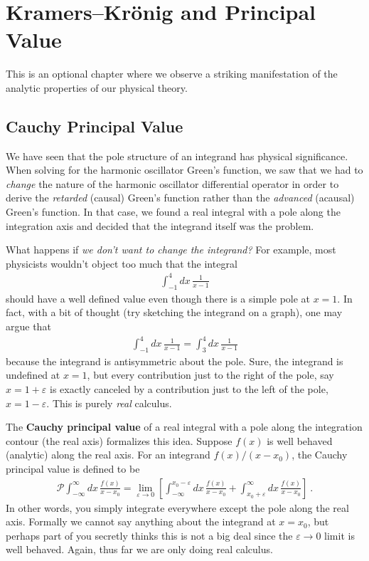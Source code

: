 
\chapter{Kramers--Kr\"onig and Principal Value }

This is an optional chapter where we observe a striking manifestation of the analytic properties of our physical theory.

\section{Cauchy Principal Value}

We have seen that the pole structure of an integrand has physical significance. When solving for the harmonic oscillator Green's function, we saw that we had to \emph{change} the nature of the harmonic oscillator differential operator in order to derive the \emph{retarded} (causal) Green's function rather than the \emph{advanced} (acausal) Green's function. In that case, we found a real integral with a pole along the integration axis and decided that the integrand itself was the problem.

What happens if \emph{we don't want to change the integrand?} For example, most physicists wouldn't object too much that the integral
\begin{align}
	\int_{-1}^4 dx\, \frac{1}{x-1}
\end{align}
should have a well defined value even though there is a simple pole at $x=1$. In fact, with a bit of thought (try sketching the integrand on a graph), one may argue that
\begin{align}
	\int_{-1}^4 dx\, \frac{1}{x-1}
	= 
	\int_{3}^4 dx\, \frac{1}{x-1}
\end{align}
because the integrand is antisymmetric about the pole. Sure, the integrand is undefined at $x=1$, but every contribution just to the right of the pole, say $x=1+\varepsilon$ is exactly canceled by a contribution just to the left of the pole, $x=1-\varepsilon$. This is purely \emph{real} calculus.

The \textbf{Cauchy principal value} of a real integral with a pole along the integration contour (the real axis) formalizes this idea. Suppose $f(x)$ is well behaved (analytic) along the real axis. For an integrand $f(x)/(x-x_0)$, the Cauchy principal value is defined to be
\begin{align}
	\mathcal P \int_{-\infty}^\infty dx\, \frac{f(x)}{x-x_0}
	= 
	\lim_{\varepsilon\to 0}
	\left[
	\int_{-\infty}^{x_0-\varepsilon} dx\, \frac{f(x)}{x-x_0}
	+\int_{x_0+\varepsilon}^\infty dx\, \frac{f(x)}{x-x_0}
	\right] \ .
\end{align}
In other words, you simply integrate everywhere except the pole along the real axis. Formally we cannot say anything about the integrand at $x=x_0$, but perhaps part of you secretly thinks this is not a big deal since the $\varepsilon\to 0$ limit is well behaved. Again, thus far we are only doing real calculus.

